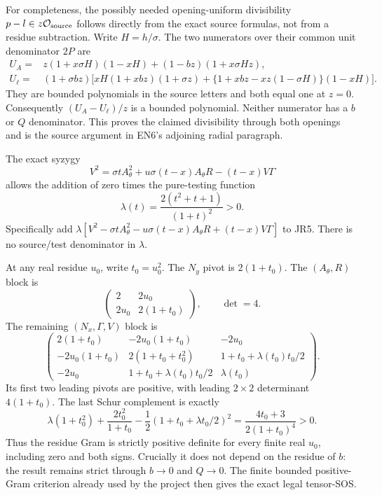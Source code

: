 For completeness, the possibly needed opening-uniform divisibility
$p-l\in z\mathcal O_{\rm source}$ follows directly from the exact
source formulas, not from a residue subtraction. Write $H=h/\sigma$.
The two numerators over their common unit denominator $2P$ are
\begin{align*}
 U_A={}&z(1+x\sigma H)(1-xH)+(1-bz)(1+x\sigma Hz),\\
 U_\ell={}&(1+\sigma bz)\big[xH(1+xbz)(1+\sigma z)
       +\{1+xbz-xz(1-\sigma H)\}(1-xH)\big].
\end{align*}
They are bounded polynomials in the source letters and both equal
one at $z=0$. Consequently $(U_A-U_\ell)/z$ is a bounded polynomial.
Neither numerator has a $b$ or $Q$ denominator. This proves the claimed
divisibility through both openings and is the source argument in EN6's
adjoining radial paragraph.

The exact syzygy
\[
 V^2=\sigma t A_\theta^2+u\sigma(t-x)A_\theta R-(t-x)V\Gamma
\tag{JR6}
\]
allows the addition of zero times the pure-testing function
\[
 \lambda(t)=\frac{2(t^2+t+1)}{(1+t)^2}>0.
\]
Specifically add
$\lambda[V^2-\sigma tA_\theta^2-u\sigma(t-x)A_\theta R+(t-x)V\Gamma]$
to JR5. There is no source/test denominator in $\lambda$.

At any real residue $u_0$, write $t_0=u_0^2$. The $N_y$ pivot is
$2(1+t_0)$. The $(A_\theta,R)$ block is
\[
 \begin{pmatrix}2&2u_0\\2u_0&2(1+t_0)\end{pmatrix},
 \qquad \det=4.
\]
The remaining $(N_x,\Gamma,V)$ block is
\[
 \begin{pmatrix}
 2(1+t_0)&-2u_0(1+t_0)&-2u_0\\
 -2u_0(1+t_0)&2(1+t_0+t_0^2)&1+t_0+\lambda(t_0)t_0/2\\
 -2u_0&1+t_0+\lambda(t_0)t_0/2&\lambda(t_0)
 \end{pmatrix}.
\tag{JR7}
\]
Its first two leading pivots are positive, with leading $2\times2$
determinant $4(1+t_0)$. The last Schur complement is exactly
\[
 \lambda(1+t_0^2)+\frac{2t_0^2}{1+t_0}
       -\frac12(1+t_0+\lambda t_0/2)^2
   =\frac{4t_0+3}{2(1+t_0)^4}>0.
\tag{JR8}
\]
Thus the residue Gram is strictly positive definite for every finite
real $u_0$, including zero and both signs. Crucially it does not depend
on the residue of $b$: the result remains strict through $b\to0$
and $Q\to0$. The finite bounded positive-Gram criterion already used
by the project then gives the exact legal tensor-SOS.


